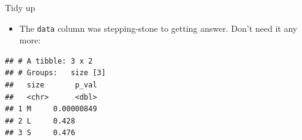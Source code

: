 \documentclass[ignorenonframetext,]{beamer}
\newenvironment{Shaded}{\begin{snugshade}}{\end{snugshade}}
\newcommand{\DataTypeTok}[1]{\textcolor[rgb]{0.13,0.29,0.53}{#1}}
\newcommand{\KeywordTok}[1]{\textcolor[rgb]{0.13,0.29,0.53}{\textbf{#1}}}
\newcommand{\NormalTok}[1]{#1}
\newcommand{\OperatorTok}[1]{\textcolor[rgb]{0.81,0.36,0.00}{\textbf{#1}}}
\newcommand{\StringTok}[1]{\textcolor[rgb]{0.31,0.60,0.02}{#1}}
\providecommand{\tightlist}{%
  \setlength{\itemsep}{0pt}\setlength{\parskip}{0pt}}
\begin{document}
\begin{frame}[fragile]{Tidy up}
\protect\hypertarget{tidy-up}{}

\begin{itemize}
\tightlist
\item
  The \texttt{data} column was stepping-stone to getting answer. Don't
  need it any more:
\end{itemize}

\small

\begin{Shaded}
\end{Shaded}

\begin{verbatim}
## # A tibble: 3 x 2
## # Groups:   size [3]
##   size       p_val
##   <chr>      <dbl>
## 1 M     0.00000849
## 2 L     0.428     
## 3 S     0.476
\end{verbatim}

\normalsize

\end{frame}
\end{document}
